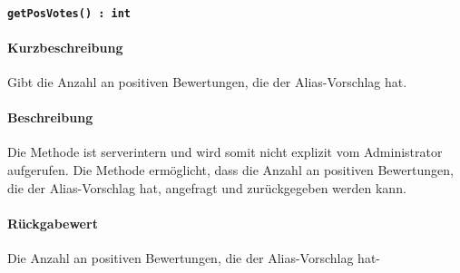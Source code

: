 \paragraph{\texttt{getPosVotes() : int}}%
\paragraph*{Kurzbeschreibung}
Gibt die Anzahl an positiven Bewertungen, die der Alias-Vorschlag hat.
\paragraph*{Beschreibung}
Die Methode ist serverintern und wird somit nicht explizit vom Administrator aufgerufen.
Die Methode ermöglicht, dass die Anzahl an positiven Bewertungen, die der Alias-Vorschlag hat, angefragt und zurückgegeben werden kann.
\paragraph*{Rückgabewert}
Die Anzahl an positiven Bewertungen, die der Alias-Vorschlag hat-
